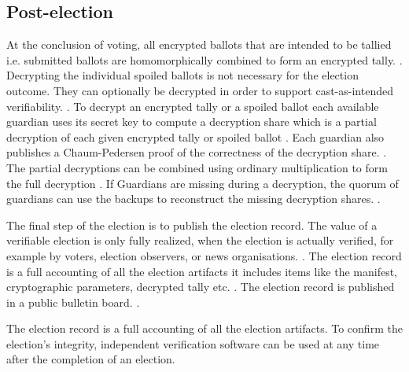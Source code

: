 \subsection{Post-election}
At the conclusion of voting, all encrypted ballots that are intended to be tallied i.e. submitted ballots are homomorphically combined to form an encrypted tally. \cite[5]{eg-spec} \cite[18]{eg-spec} \cite[15]{eg-paper}. Decrypting the individual spoiled ballots is not necessary for the election outcome. They can optionally be decrypted in order to support cast-as-intended verifiability. \cite[17]{eg-paper}. To decrypt an encrypted tally or a spoiled ballot each available guardian uses its secret key to compute a decryption share which is a partial decryption of each given encrypted tally or spoiled ballot \cite[18]{eg-spec} \cite[15]{eg-paper}. Each guardian also publishes a Chaum-Pedersen proof of the correctness of the decryption share. \cite[18]{eg-spec}. The partial decryptions can be combined using ordinary multiplication to form the full decryption \cite{eg-docs}. If Guardians are missing during a decryption, the quorum of guardians can use the backups to reconstruct the missing decryption shares. \cite{eg-docs}. 

The final step of the election is to publish the election record. The value of a verifiable election is only fully realized, when the election is actually verified, for example by voters, election observers, or news organisations. \cite[17]{eg-spec}. The election record is a full accounting of all the election artifacts it includes items like the manifest, cryptographic parameters, decrypted tally etc. \cite[24]{eg-spec}. The election record is published in a public bulletin board. \cite[17]{eg-spec}. 

The election record is a full accounting of all the election artifacts. To confirm the election's integrity, independent verification software can be used at any time after the completion of an election. \cite[6]{eg-paper}


